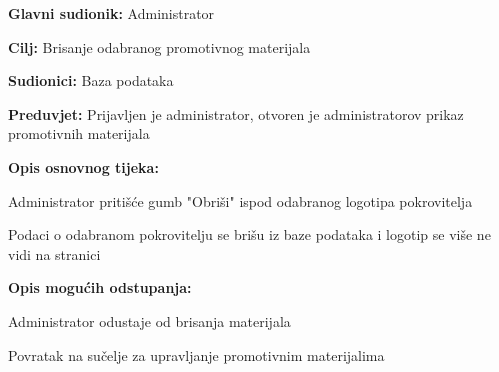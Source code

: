 					\noindent {}
					\begin{packed_item}
						
						\item \textbf{Glavni sudionik: }Administrator
						\item  \textbf{Cilj:} Brisanje odabranog promotivnog materijala
						\item  \textbf{Sudionici:} Baza podataka
						\item  \textbf{Preduvjet:} Prijavljen je administrator, otvoren je administratorov prikaz promotivnih materijala
						\item  \textbf{Opis osnovnog tijeka:}
						
						\item[] \begin{packed_enum}
							
							\item Administrator pritišće gumb "Obriši" ispod odabranog logotipa pokrovitelja
							\item Podaci o odabranom pokrovitelju se brišu iz baze podataka i logotip se više ne vidi na stranici
							
						\end{packed_enum}
						
						\item  \textbf{Opis mogućih odstupanja:}
						
						\item[] \begin{packed_item}
							
							\item[2.a] Administrator odustaje od brisanja materijala
							\item[] \begin{packed_enum}
								
								\item Povratak na sučelje za upravljanje promotivnim materijalima
								
							\end{packed_enum}
							
						\end{packed_item}
					\end{packed_item}
					
